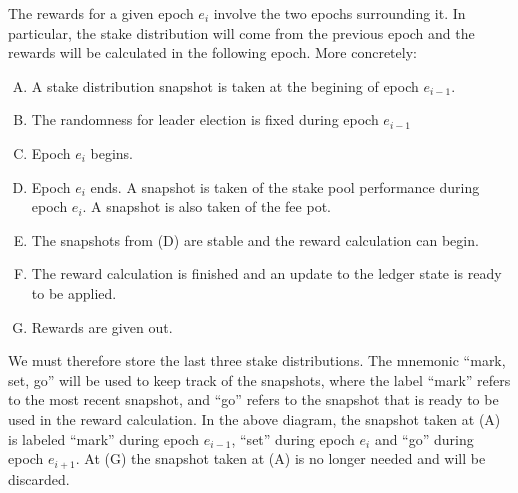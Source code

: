 The rewards for a given epoch $e_i$ involve the two epochs surrounding it.
In particular, the stake distribution will come from the previous epoch
and the rewards will be calculated in the following epoch.
More concretely:
\begin{enumerate}[(A)]%
  \item A stake distribution snapshot is taken at the begining of epoch $e_{i-1}$.
  \item The randomness for leader election is fixed during epoch $e_{i-1}$
  \item Epoch $e_{i}$ begins.
  \item Epoch $e_{i}$ ends.
    A snapshot is taken of the stake pool performance during epoch $e_{i}$.
    A snapshot is also taken of the fee pot.
  \item The snapshots from (D) are stable and the reward calculation can begin.
  \item The reward calculation is finished and an update to the ledger state
    is ready to be applied.
  \item Rewards are given out.
\end{enumerate}

\usetikzlibrary{decorations.pathreplacing}

We must therefore store the last three stake distributions.
The mnemonic ``mark, set, go'' will be used to keep
track of the snapshots, where the label ``mark'' refers to the most recent snapshot,
and ``go'' refers to the snapshot that is ready to be used in the reward calculation.
In the above diagram, the snapshot taken at (A) is labeled ``mark'' during epoch $e_{i-1}$,
``set'' during epoch $e_i$ and ``go'' during epoch $e_{i+1}$. At (G) the snapshot
taken at (A) is no longer needed and will be discarded.

